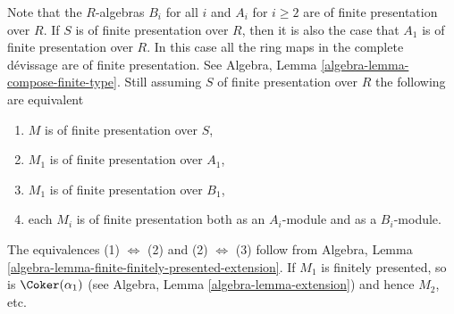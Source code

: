 \begin{remark}
\label{remark-finite-presentation}
Note that the $R$-algebras $B_i$ for all $i$ and $A_i$ for $i \geq 2$
are of finite presentation over $R$. If $S$ is of finite presentation over
$R$, then it is also the case that $A_1$ is of finite presentation over
$R$. In this case all the ring maps in the complete d\'evissage are of
finite presentation. See
Algebra, Lemma \ref{algebra-lemma-compose-finite-type}.
Still assuming $S$ of finite presentation over $R$
the following are equivalent
\begin{enumerate}
\item $M$ is of finite presentation over $S$,
\item $M_1$ is of finite presentation over $A_1$,
\item $M_1$ is of finite presentation over $B_1$,
\item each $M_i$ is of finite presentation both as an $A_i$-module
and as a $B_i$-module.
\end{enumerate}
The equivalences (1) $\Leftrightarrow$ (2) and (2) $\Leftrightarrow$ (3)
follow from
Algebra, Lemma \ref{algebra-lemma-finite-finitely-presented-extension}.
If $M_1$ is finitely presented, so is $\Coker(\alpha_1)$ (see
Algebra, Lemma \ref{algebra-lemma-extension})
and hence $M_2$, etc.
\end{remark}